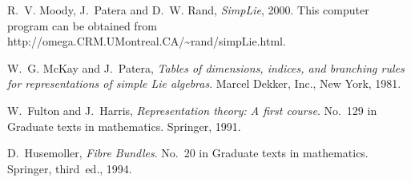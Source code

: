 \documentclass[12pt,a4paper]{article}
\begin{document}
\begin{thebibliography}{10}
R.~V. Moody, J.~Patera and D.~W. Rand, {\it {SimpLie}},  2000.
\newblock This computer program can be obtained from
  http://omega.CRM.UMontreal.CA/\textasciitilde rand/simpLie.html.

W.~G. McKay and J.~Patera, {\em Tables of dimensions, indices, and branching
  rules for representations of simple {Lie} algebras}.
\newblock Marcel Dekker, Inc., New York, 1981.

W.~Fulton and J.~Harris, {\em Representation theory: A first course}.
\newblock No.~129 in Graduate texts in mathematics. Springer, 1991.

D.~Husemoller, {\em Fibre Bundles}.
\newblock No.~20 in Graduate texts in mathematics. Springer, third~ed., 1994.

\end{thebibliography}\endgroup
\end{document}
